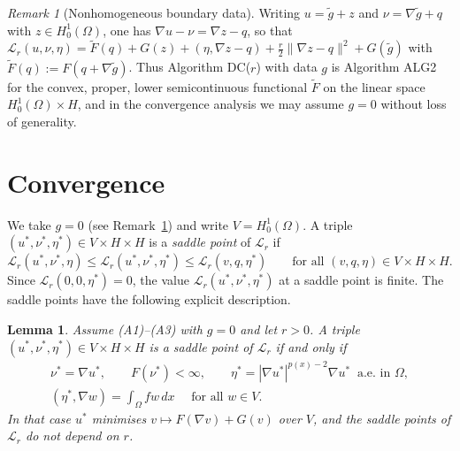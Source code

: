 \documentclass[11pt]{amsart}
\newcommand{\LL}{\mathcal L}
\newcommand{\dx}{\,dx}
\newtheorem{lema}[teo]{Lemma}
\theoremstyle{definition}
\theoremstyle{remark}
\newtheorem{remark}[teo]{Remark}
\numberwithin{equation}{section}
\begin{document}
\begin{remark}[Nonhomogeneous boundary data]\label{rem.lift}
Writing $u=\tilde g+z$ and $\nu=\nabla\tilde g+q$ with $z\in H^1_0(\Omega)$, one has $\nabla u-\nu=\nabla z-q$, so that $\LL_r(u,\nu,\eta)=\tilde F(q)+G(z)+(\eta,\nabla z-q)+\frac r2\|\nabla z-q\|^2+G(\tilde g)$ with $\tilde F(q):=F(q+\nabla\tilde g)$. Thus Algorithm DC($r$) with data $g$ is Algorithm ALG2 for the convex, proper, lower semicontinuous functional $\tilde F$ on the linear space $H^1_0(\Omega)\times H$, and in the convergence analysis we may assume $g=0$ without loss of generality.
\end{remark}

\section{Convergence}\label{sec.convergence}

We take $g=0$ (see Remark~\ref{rem.lift}) and write $V=H^1_0(\Omega)$. A triple $(u^*,\nu^*,\eta^*)\in V\times H\times H$ is a \emph{saddle point} of $\LL_r$ if
$$
\LL_r(u^*,\nu^*,\eta)\le\LL_r(u^*,\nu^*,\eta^*)\le\LL_r(v,q,\eta^*)\qquad\text{for all }(v,q,\eta)\in V\times H\times H.
$$
Since $\LL_r(0,0,\eta^*)=0$, the value $\LL_r(u^*,\nu^*,\eta^*)$ at a saddle point is finite. The saddle points have the following explicit description.

\begin{lema}\label{lem.saddle}
Assume (A1)--(A3) with $g=0$ and let $r>0$. A triple $(u^*,\nu^*,\eta^*)\in V\times H\times H$ is a saddle point of $\LL_r$ if and only if
\begin{equation}\label{eq.saddle}
\begin{gathered}
\nu^*=\nabla u^*,\qquad F(\nu^*)<\infty,\qquad \eta^*=|\nabla u^*|^{p(x)-2}\nabla u^*\ \text{ a.e. in }\Omega,\\
(\eta^*,\nabla w)=\int_\Omega fw\dx\quad \text{ for all } w\in V.
\end{gathered}
\end{equation}
In that case $u^*$ minimises $v\mapsto F(\nabla v)+G(v)$ over $V$, and the saddle points of $\LL_r$ do not depend on $r$.
\end{lema}
\end{document}
